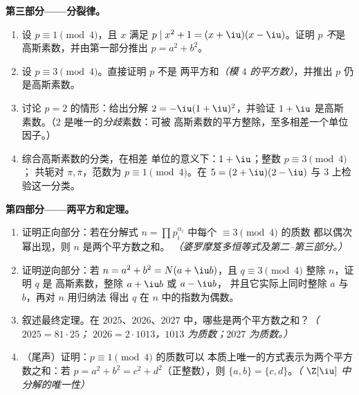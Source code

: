 \begin{problem}
\medskip
\noindent\textbf{第三部分——分裂律。}
\begin{enumerate}[resume]
  \item 设 $p \equiv 1 \pmod 4$，且 $x$ 满足 $p \mid x^2 + 1 =
        (x + \iu)(x - \iu)$。证明 $p$ \emph{不}是
        高斯素数，并由第一部分推出 $p = a^2 + b^2$。
  \item 设 $p \equiv 3 \pmod 4$。直接证明 $p$ 不是
        两平方和\emph{（模 $4$ 的平方数）}，并推出
        $p$ 仍是高斯素数。
  \item 讨论 $p = 2$ 的情形：给出分解 $2 =
        -\iu(1+\iu)^2$，并验证 $1 + \iu$ 是高斯
        素数。（$2$ 是唯一的\emph{分歧}素数：可被
        高斯素数的平方整除，至多相差一个单位因子。）
  \item 综合高斯素数的分类，在相差
        单位的意义下：$1 + \iu$；整数 $p \equiv 3 \pmod 4$；
        共轭对 $\pi, \bar\pi$，范数为 $p \equiv 1 \pmod
        4$。在 $5 = (2+\iu)(2-\iu)$ 与 $3$ 上检验这一分类。
\end{enumerate}

\medskip
\noindent\textbf{第四部分——两平方和定理。}
\begin{enumerate}[resume]
  \item 证明正向部分：若在分解式 $n =
        \prod p_i^{\alpha_i}$ 中每个 $\equiv 3 \pmod 4$ 的质数
        都以偶次幂出现，则 $n$ 是两个平方数之和。
        \emph{（婆罗摩笈多恒等式及第二--第三部分。）}
  \item 证明逆向部分：若 $n = a^2 + b^2 = N(a + \iu b)$，且
        $q \equiv 3 \pmod 4$ 整除 $n$，证明 $q$ 是
        高斯素数，整除 $a + \iu b$ 或 $a - \iu b$，
        并且它实际上同时整除 $a$ 与 $b$，再对 $n$ 用归纳法
        得出 $q$ 在 $n$ 中的指数为偶数。
  \item 叙述最终定理。在 $2025$、$2026$、$2027$
        中，哪些是两个平方数之和？\emph{（$2025 = 81 \cdot 25$；
        $2026 = 2 \cdot 1013$，$1013$ 为质数；$2027$ 为质数。）}
  \item （尾声）证明：$p \equiv 1 \pmod 4$ 的质数可以
        本质上唯一的方式表示为两个平方数之和：若 $p =
        a^2 + b^2 = c^2 + d^2$（正整数），则 $\{a, b\}
        = \{c, d\}$。\emph{（
        $\Z[\iu]$ 中分解的唯一性）}
\end{enumerate}


\end{problem}
